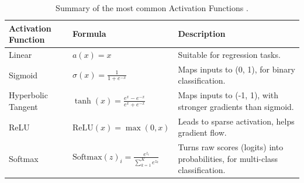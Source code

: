 \begin{table}[htb!]
\centering
\footnotesize
\caption{Summary of the most common Activation Functions \cite{goodfellow_deep_2016}.}
\label{Tables:ActivationFunctions}
\begin{tabularx}{\textwidth}{@{}lXl@{}}
\toprule
\textbf{Activation Function} & \textbf{Formula} & \textbf{Description} \\
\midrule
Linear & \( a(x) = x \) & Suitable for regression tasks. \\
\addlinespace
Sigmoid & \( \sigma(x) = \frac{1}{1 + e^{-x}} \) & Maps inputs to (0, 1), for binary classification. \\
\addlinespace
Hyperbolic Tangent & \( \tanh(x) = \frac{e^{x} - e^{-x}}{e^{x} + e^{-x}} \) & Maps inputs to (-1, 1), with stronger gradients than sigmoid. \\
\addlinespace
ReLU & \( \text{ReLU}(x) = \max(0, x) \) & Leads to sparse activation, helps gradient flow. \\
\addlinespace
Softmax & \( \text{Softmax}(z)_i = \frac{e^{z_i}}{\sum_{k=1}^K e^{z_k}} \) & Turns raw scores (logits) into probabilities, for multi-class classification. \\
\bottomrule
\end{tabularx}
\end{table}